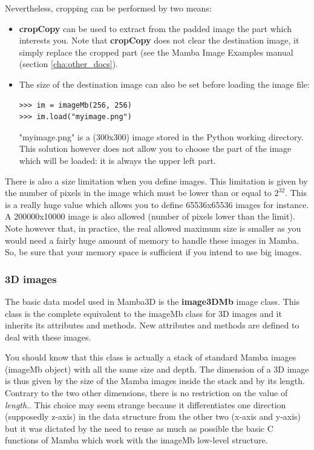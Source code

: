 \documentclass[a4paper,10pt,oneside]{article}
\begin{document}
Nevertheless, cropping can be performed by two means:

\begin{itemize}
\item \textbf{cropCopy} can be used to extract from the padded image the part which interests you. Note that
\textbf{cropCopy} does not clear the destination image, it simply replace the cropped part (see the Mamba
Image Examples manual (section \ref{cha:other_docs}).
\item The size of the destination image can also be set before loading the image file:

\lstset{language=Python}
\begin{lstlisting}
>>> im = imageMb(256, 256)
>>> im.load("myimage.png")
\end{lstlisting}

"myimage.png" is a (300x300) image stored in the Python working directory. This solution however does not allow you
to choose the part of the image which will be loaded: it is always the upper left part.
\end{itemize}

There is also a size limitation when you define images. This limitation is given by
the number of pixels in the image which must be lower than or equal to $2^{32}$.
This is a really huge value which allows you to define 65536x65536 images for instance.
A 200000x10000 image is also allowed (number of pixels lower than the limit).
Note however that, in practice, the real allowed maximum size is smaller as you would
need a fairly huge amount of memory to handle these images in Mamba. So, be sure
that your memory space is sufficient if you intend to use big images.

\subsubsection{3D images}

The basic data model used in Mamba3D is the \textbf{image3DMb} image class. This class is the
complete equivalent to the imageMb class for 3D images and it inherits its attributes and methods.
New attributes and methods are defined to deal with these images.

You should know that this class is actually a stack of standard Mamba images
(imageMb object) with all the same size and depth. The dimension of a 3D image
is thus given by the size of the Mamba images inside the stack and by its
length. Contrary to the two other dimensions, there is no restriction
on the value of \textit{length}.. This choice may seem strange because it differentiates one direction
(supposedly z-axis) in the data structure from the other two (x-axis and
y-axis) but it was dictated by the need to reuse as much as possible the 
basic C functions of Mamba which work with the imageMb low-level structure.
\end{document}
